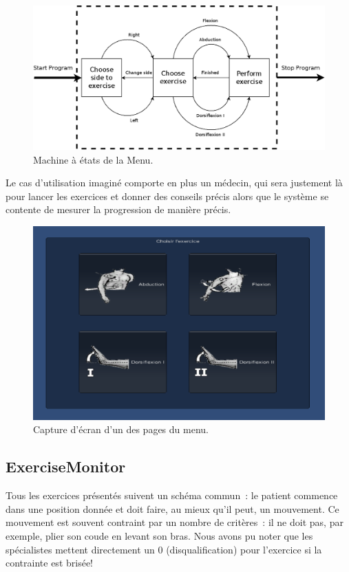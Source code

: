\begin{figure}[h!]
\centering
\includegraphics[width=\linewidth]{../images/menu}
\caption{Machine à états de la Menu.}
\end{figure}

Le cas d'utilisation imaginé comporte en plus un médecin, qui sera justement là
pour lancer les exercices et donner des conseils précis alors que le système 
se contente de mesurer la progression de manière précis.

\begin{figure}[h!]
\centering
\includegraphics[width=0.8\linewidth]{../images/menu2}
\caption{Capture d'écran d'un des pages du menu.}
\end{figure}
    

\subsection{ExerciseMonitor}

Tous les exercices présentés suivent un schéma commun~: le patient commence dans
une position donnée et doit faire, au mieux qu'il peut, un mouvement. Ce mouvement
est souvent contraint par un nombre de critères~: il ne doit pas, par exemple,
plier son coude en levant son bras. Nous avons pu noter que les spécialistes 
mettent directement un 0
(disqualification) pour l'exercice si la contrainte est brisée!

